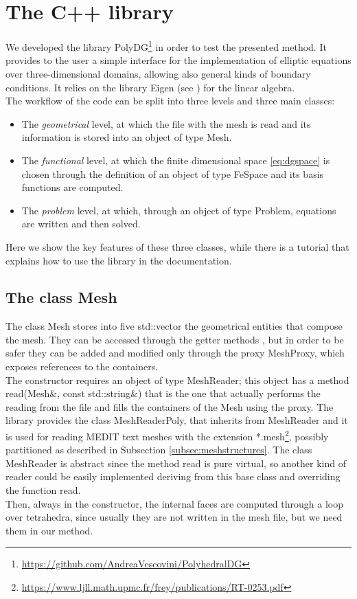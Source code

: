 \documentclass[12pt, a4paper]{article}
\newcommand{\code}[1]{{\footnotesize\ttfamily #1}}
\theoremstyle{definition}
\theoremstyle{plain}
\theoremstyle{plain}
\theoremstyle{definition}
\begin{document}
\section{The C++ library}\label{sec:lib}
We developed the library PolyDG\footnote{\url{https://github.com/AndreaVescovini/PolyhedralDG}} in order to test the presented method. It provides to the user a simple interface for the implementation of elliptic equations over
three-dimensional domains, allowing also general kinds of boundary conditions. It relies on the library Eigen (see \cite{eigen}) for the linear algebra.\\
The workflow of the code can be split into three levels and three main classes:
\begin{itemize}
	\item The \emph{geometrical} level, at which the file with the mesh is read and its information is stored into an object of type \code{Mesh}.
	\item The \emph{functional} level, at which the finite dimensional space \eqref{eq:dgspace} is chosen through the definition of an object of type \code{FeSpace} and its basis functions are computed.
	\item The \emph{problem} level, at which, through an object of type \code{Problem}, equations are written and then solved.
\end{itemize}
Here we show the key features of these three classes, while there is a tutorial that explains how to use the library in the documentation.
\subsection{The class Mesh}

The class \code{Mesh} stores into five \code{std::vector} the geometrical entities that compose the mesh. They can be accessed through the getter methods , but in order to be safer they can be added and modified only through the proxy \code{MeshProxy}, which exposes references to the containers.\\
The constructor requires an object of type \code{MeshReader}; this object has a method \code{read(Mesh\&, const std::string\&)} that is the one that actually performs the reading from the file and fills the containers of the \code{Mesh} using the proxy. The library provides the class \code{MeshReaderPoly}, that inherits from \code{MeshReader} and it is used for reading MEDIT text meshes with the extension *.mesh\footnote{\url{https://www.ljll.math.upmc.fr/frey/publications/RT-0253.pdf}}, possibly partitioned as described in Subsection \ref{subsec:meshstructures}. The class \code{MeshReader} is abstract since the method \code{read} is pure virtual, so another kind of reader could be easily implemented deriving from this base class and overriding the function \code{read}.\\
Then, always in the constructor, the internal faces are computed through a loop over tetrahedra, since usually they are not written in the mesh file, but we need them in our method.\\
\end{document}
